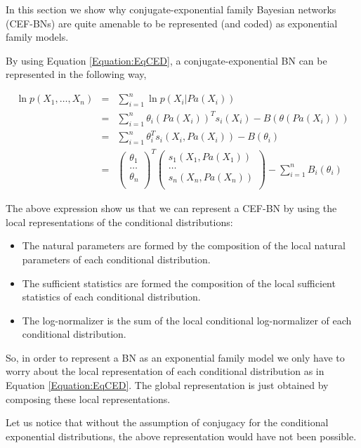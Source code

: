\documentclass[11pt, oneside]{article}   	%
\numberwithin{figure}{section}
\numberwithin{equation}{section}
\numberwithin{table}{section}
\theoremstyle{definition}
\begin{document}
In this section we show why conjugate-exponential family Bayesian networks (CEF-BNs) are quite amenable to be represented (and coded) as exponential family models. 

By using Equation \ref{Equation:EqCED}, a conjugate-exponential BN can be represented in the following way, 

\begin{eqnarray}
\label{Equation:CEFSS}
\ln p(X_1,\ldots, X_n) &=& \sum_{i=1}^n \ln p(X_i|Pa(X_i))\nonumber\\
&=& \sum_{i=1}^n \theta_i(Pa(X_i))^T s_i(X_i) - B(\theta(Pa(X_i)))\nonumber\\
&=& \sum_{i=1}^n \theta_i^T s_i(X_i, Pa(X_i)) - B(\theta_i)\nonumber\\
&=&
\begin{pmatrix}
\theta_1\\
\ldots \\
\theta_n\\
\end{pmatrix}^T
\begin{pmatrix}
s_1(X_1,Pa(X_1)) \\
\ldots \\
s_n(X_n,Pa(X_n)) \\
\end{pmatrix}
- \sum_{i=1}^n B_i(\theta_i)
\end{eqnarray}

The above expression show us that we can represent a CEF-BN by using the local representations of the conditional distributions:

\begin{itemize}
\item The natural parameters are formed by the composition of the local natural parameters of each conditional distribution. 
\item The sufficient statistics are formed the composition of the local sufficient statistics of each conditional distribution. 
\item The log-normalizer is the sum of the local conditional log-normalizer of each conditional distribution. 
\end{itemize}

So, in order to represent a BN as an exponential family model we only have to worry about the local representation of each conditional distribution as in Equation \ref{Equation:EqCED}. The global representation is just obtained by composing these local representations. 

Let us notice that without the assumption of conjugacy  for the conditional exponential distributions, the above representation would have not been possible. 
\end{document}

